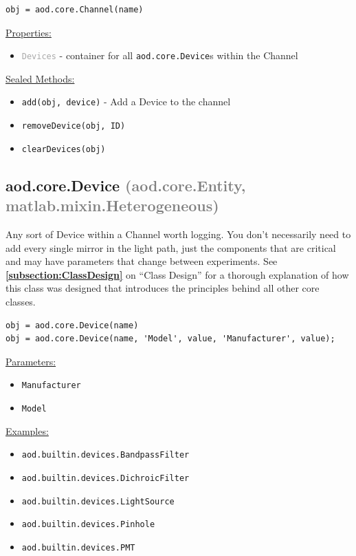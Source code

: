 \documentclass[10pt]{exam}
\newcommand\myurl[1]{\textcolor{blue}{\underline{#1}}}
\newcommand\myref[1]{\textbf{\myurl{\ref{#1}}}}
\newcommand\myparent[1]{\textcolor{gray}{(#1)}}
\newcommand\aodparam[1]{\textcolor{codepurple}{\texttt{#1}}}
\newcommand\aodclass[1]{\textcolor{codeblue}{\texttt{#1}}}
\newcommand\aodprop[1]{\textcolor{darkgray}{\texttt{#1}}}
\newcommand\aodfcn[1]{\textcolor{darkteal}{\texttt{#1}}}
\newcommand\docheader[1]{\vspace{0.6ex}\noindent\underline{#1}\vspace{0.15ex}}
\begin{document}
		\begin{lstlisting}[style=matlab-editor, basicstyle=\mlttfamily\footnotesize]
obj = aod.core.Channel(name)
		\end{lstlisting}
		
		\docheader{Properties:}
		\begin{itemize}
			\item \aodprop{Devices} - container for all \aodclass{aod.core.Device}s within the Channel
		\end{itemize}
		\docheader{Sealed Methods:}
		\begin{itemize}
			\item \aodfcn{add(obj, device)} - Add a Device to the channel
			\item \aodfcn{removeDevice(obj, ID)}
			\item \aodfcn{clearDevices(obj)}
		\end{itemize}

	\subsection{aod.core.Device  \myparent{aod.core.Entity, matlab.mixin.Heterogeneous}}
		\noindent Any sort of Device within a Channel worth logging. You don't necessarily need to add every single mirror in the light path, just the components that are critical and may have parameters that change between experiments. See \myref{subsection:ClassDesign} on ``Class Design'' for a thorough explanation of how this class was designed that introduces the principles behind all other core classes.
		
		\begin{lstlisting}[style=matlab-editor, basicstyle=\mlttfamily\footnotesize]
obj = aod.core.Device(name)
obj = aod.core.Device(name, 'Model', value, 'Manufacturer', value);
		\end{lstlisting}
		\docheader{Parameters:}
		\begin{itemize}
			\item \aodparam{Manufacturer}
			\item \aodparam{Model}
		\end{itemize}
		\docheader{Examples:}
		\begin{itemize}
			\item \aodclass{aod.builtin.devices.BandpassFilter}
			\item \aodclass{aod.builtin.devices.DichroicFilter}
			\item \aodclass{aod.builtin.devices.LightSource}
			\item \aodclass{aod.builtin.devices.Pinhole}
			\item \aodclass{aod.builtin.devices.PMT}
		\end{itemize}
	
\end{document}
